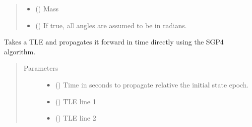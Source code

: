 \documentclass[letterpaper,10pt,english]{sphinxmanual}
\begin{document}
\begin{fulllineitems}
\begin{fulllineitems}
\begin{quote}
\begin{description}
\begin{itemize}
\item {} 
 () \textendash{} Mass

\item {} 
 () \textendash{} If true, all angles are assumed to be in radians.

\end{itemize}

\end{description}\end{quote}

\end{fulllineitems}


\begin{fulllineitems}
\label{\detokenize{modules/propagator_sgp4:propagator_sgp4.PropagatorSGP4.get_orbit_TLE}}
Takes a TLE and propagates it forward in time directly using the SGP4 algorithm.
\begin{quote}\begin{description}
\item[{Parameters}] \leavevmode\begin{itemize}
\item {} 
 () \textendash{} Time in seconds to propagate relative the initial state epoch.

\item {} 
 () \textendash{} TLE line 1

\item {} 
 () \textendash{} TLE line 2

\end{itemize}

\end{description}\end{quote}

\end{fulllineitems}



\end{fulllineitems}
\end{document}
